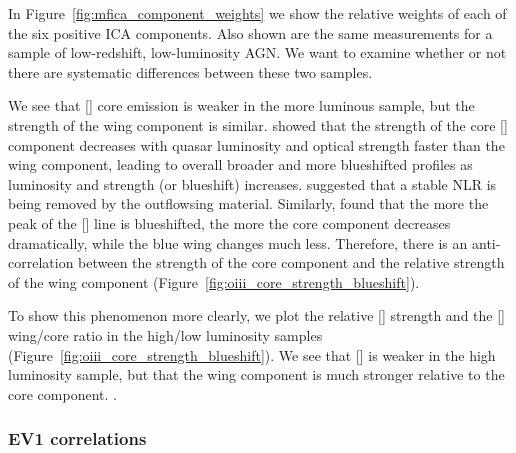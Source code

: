 In Figure~\ref{fig:mfica_component_weights} we show the relative weights of each of the six positive \ac{ICA} components. 
Also shown are the same measurements for a sample of low-redshift, low-luminosity AGN. 
We want to examine whether or not there are systematic differences between these two samples. 

We see that [] core emission is weaker in the more luminous sample, but the strength of the wing component is similar. 
\citet{shen14} showed that the strength of the core [] component decreases with quasar luminosity and optical  strength faster than the wing component, leading to overall broader and more blueshifted profiles as luminosity and  strength (or  blueshift) increases. 
\citet{shen14} suggested that a stable \ac{NLR} is being removed by the outflowsing material. 
Similarly, \citet{zhang11} found that the more the peak of the [] line is blueshifted, the more the core component decreases dramatically, while the blue wing changes much less. 
Therefore, there is an anti-correlation between the strength of the core component and the relative strength of the wing component (Figure~\ref{fig:oiii_core_strength_blueshift}). 

To show this phenomenon more clearly, we plot the relative [] strength and the [] wing/core ratio in the high/low luminosity samples (Figure~\ref{fig:oiii_core_strength_blueshift}). 
We see that [] is weaker in the high luminosity sample, but that the wing component is much stronger relative to the core component. 
. 

\subsubsection{\ac{EV1} correlations}

